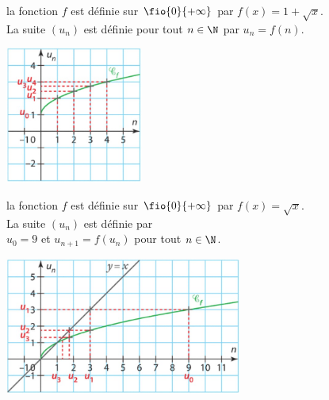 \documentclass[a4paper,11pt,cours]{nsi} %
\begin{document}
\begin{exemple}[s]
    \begin{multicols}{2}
        la fonction $f$ est définie sur $\fio{0}{+\infty}$ par $f(x)=1+\sqrt{x}$.\\
        La suite $(u_n)$ est définie pour tout $n\in\N$ par $u_n=f(n)$.
        \begin{center}
            \includegraphics[height=4.5cm]{graphique2.jpg}
        \end{center}
        la fonction $f$ est définie sur $\fio{0}{+\infty}$ par $f(x)=\sqrt{x}$.\\
        La suite $(u_n)$ est définie par\\ $u_0=9$ et $u_{n+1}=f(u_n)$ pour tout $n\in\N$.
        \begin{center}
            \includegraphics[height=4.5cm]{graphique3.jpg}
        \end{center}
    \end{multicols}
\end{exemple}
\end{document}
